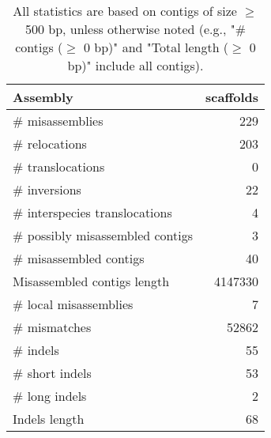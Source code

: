 \documentclass[12pt,a4paper]{article}
\begin{document}
\begin{table}[ht]
\begin{center}
\caption{All statistics are based on contigs of size $\geq$ 500 bp, unless otherwise noted (e.g., "\# contigs ($\geq$ 0 bp)" and "Total length ($\geq$ 0 bp)" include all contigs).}
\begin{tabular}{|l*{1}{|r}|}
\hline
Assembly & scaffolds \\ \hline
\# misassemblies & 229 \\ \hline
\hspace{5mm}\# relocations & 203 \\ \hline
\hspace{5mm}\# translocations & 0 \\ \hline
\hspace{5mm}\# inversions & 22 \\ \hline
\hspace{5mm}\# interspecies translocations & 4 \\ \hline
\# possibly misassembled contigs & 3 \\ \hline
\# misassembled contigs & 40 \\ \hline
Misassembled contigs length & 4147330 \\ \hline
\# local misassemblies & 7 \\ \hline
\# mismatches & 52862 \\ \hline
\# indels & 55 \\ \hline
\hspace{5mm}\# short indels & 53 \\ \hline
\hspace{5mm}\# long indels & 2 \\ \hline
Indels length & 68 \\ \hline
\end{tabular}
\end{center}
\end{table}
\end{document}
